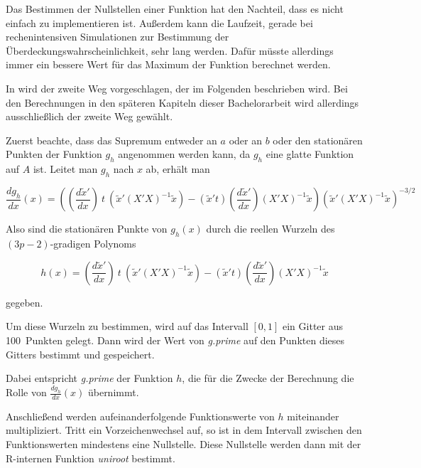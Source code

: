 \documentclass[12pt,a4paper]{article}
\theoremstyle{definition}
\theoremstyle{definition}
\theoremstyle{definition}
\theoremstyle{definition}
\newcommand{\ngridpoly}{100}
\begin{document}
Das Bestimmen der Nullstellen einer Funktion hat den Nachteil, dass es nicht einfach zu implementieren ist. Außerdem kann die Laufzeit, gerade bei rechenintensiven Simulationen zur Bestimmung der Überdeckungswahrscheinlichkeit, sehr lang werden. Dafür müsste allerdings immer ein bessere Wert für das Maximum der Funktion berechnet werden.

In \cite{Liu64} wird der zweite Weg vorgeschlagen, der im Folgenden beschrieben wird. Bei den Berechnungen in den späteren Kapiteln dieser Bachelorarbeit wird allerdings ausschließlich der zweite Weg gewählt.

Zuerst beachte, dass das Supremum entweder an $a$ oder an $b$ oder den stationären Punkten der Funktion $g_h$ angenommen werden kann, da $g_h$ eine glatte Funktion auf $A$ ist. Leitet man $g_h$ nach $x$ ab, erhält man

\begin{equation*}
\frac{d g_h}{dx} \left( x \right) = 
\left( \left( \frac{d\tilde{x}'}{dx} \right) ~ t ~ \left( \tilde{x}'(X'X)^{-1}\tilde{x} \right) - \left( \tilde{x}'t \right) \left( \frac{d\tilde{x}'}{dx} \right) (X'X)^{-1} \tilde{x} \right)
\left( \tilde{x}'(X'X)^{-1}\tilde{x} \right)^{-3/2}
\end{equation*}

Also sind die stationären Punkte von $g_h(x)$ durch die reellen Wurzeln des $(3p-2)$-gradigen Polynoms

\begin{equation*}
h \left( x \right) = 
\left( \frac{d\tilde{x}'}{dx} \right) ~t~ 
\left( \tilde{x}'(X'X)^{-1}\tilde{x} \right) - 
\left( \tilde{x}'t \right) 
\left( \frac{d\tilde{x}'}{dx} \right) 
(X'X)^{-1} \tilde{x}
\end{equation*}

gegeben.

Um diese Wurzeln zu bestimmen, wird auf das Intervall $[0,1]$ ein Gitter aus \ngridpoly ~Punkten gelegt. Dann wird der Wert von \textit{g.prime} auf den Punkten dieses Gitters bestimmt und gespeichert. 

Dabei entspricht \textit{g.prime} der Funktion $h$, die für die Zwecke der Berechnung die Rolle von $\frac{d g_h}{dx}(x)$ übernimmt.

Anschließend werden aufeinanderfolgende Funktionswerte von $h$ miteinander multipliziert. Tritt ein Vorzeichenwechsel auf, so ist in dem Intervall zwischen den Funktionswerten mindestens eine Nullstelle. Diese Nullstelle werden dann mit der R-internen Funktion \textit{uniroot} bestimmt.
\end{document}
